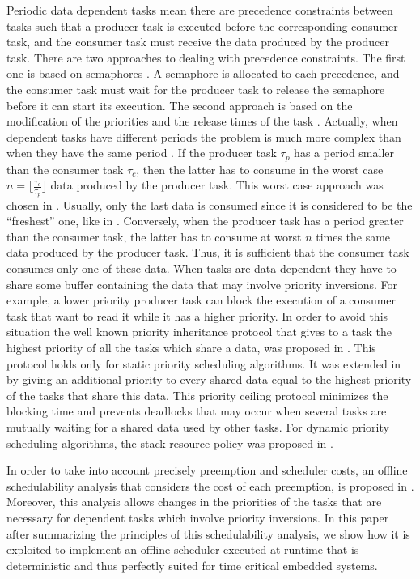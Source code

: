\documentclass[conference,compsocconf]{IEEEtran}
\begin{document}
Periodic data dependent tasks mean there are precedence constraints between
tasks \cite{Chetto90} such that a producer task is executed before the
corresponding consumer task, and the consumer task must receive the data
produced by the producer task. There are two approaches to dealing with
precedence constraints. The first one is based on semaphores \cite{forget11}. A
semaphore is allocated to each precedence, and the consumer task must wait for
the producer task to release the semaphore before it can start its
execution. The second approach is based on the modification of the priorities
and the release times of the task \cite{Chetto90,forget10}. Actually, when
dependent tasks have different periods the problem is much more complex than
when they have the same period \cite{richardCottetRichard01}. If the producer
task ${\tau_p}$ has a period smaller than the consumer task ${\tau_c}$, then
the latter has to consume in the worst case $n= \lfloor \frac {\tau_c}{\tau_p}
\rfloor$ data produced by the producer task. This worst case approach was
chosen in \cite{pdcs07}. Usually, only the last data is consumed since it is
considered to be the ``freshest'' one, like in
\cite{richardCottetRichard01}. Conversely, when the producer task has a period
greater than the consumer task, the latter has to consume at worst $n$ times
the same data produced by the producer task. Thus, it is sufficient that the
consumer task consumes only one of these data. When tasks are data dependent
they have to share some buffer containing the data that may involve priority
inversions. For example, a lower priority producer task can block the execution
of a consumer task that want to read it while it has a higher priority. In
order to avoid this situation the well known priority inheritance protocol that
gives to a task the highest priority of all the tasks which share a data, was
proposed in \cite{ShaRajkumarLehoczky90}.  This protocol holds only for static
priority scheduling algorithms. It was extended in \cite{ShaRajkumarLehoczky90}
by giving an additional priority to every shared data equal to the highest
priority of the tasks that share this data. This priority ceiling protocol
minimizes the blocking time and prevents deadlocks that may occur when several
tasks are mutually waiting for a shared data used by other tasks. For dynamic
priority scheduling algorithms, the stack resource policy was proposed in
\cite{baker91}.

In order to take into account precisely preemption and scheduler costs, an
offline schedulability analysis that considers the cost of each preemption, is
proposed in \cite{icse13}. Moreover, this analysis allows changes in the
priorities of the tasks that are necessary for dependent tasks which involve
priority inversions. In this paper after summarizing the principles of this
schedulability analysis, we show how it is exploited to implement an offline
scheduler executed at runtime that
is deterministic and thus perfectly suited for time critical embedded systems.
\end{document}

